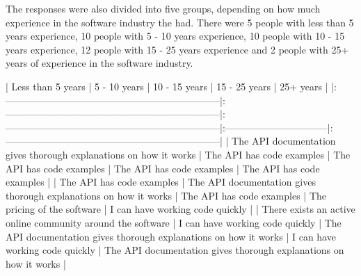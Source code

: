 \documentclass[11pt]{article}
\begin{document}
\begin{multicols}{2}

    The responses were also divided into five groups, depending on how much
    experience in the software industry the had. There were 5 people with
    less than 5 years experience, 10 people with 5 - 10 years experience, 10
    people with 10 - 15 years experience, 12 people with 15 - 25 years
    experience and 2 people with 25+ years of experience in the software
    industry.

    |                         Less than 5 years                         |                           5 - 10 years                            |                           10 - 15 years                           |          15 - 25 years          |                             25+ years                             |
    |:------------------------------------------------------------------|:------------------------------------------------------------------|:------------------------------------------------------------------|:--------------------------------|:------------------------------------------------------------------|
    | The API documentation gives thorough explanations on how it works | The API has code examples                                         | The API has code examples                                         | The API has code examples       | The API has code examples                                         |
    | The API has code examples                                         | The API documentation gives thorough explanations on how it works | The API has code examples                                         | The pricing of the software     | I can have working code quickly                                   |
    | There exists an active online community around the software       | I can have working code quickly                                   | The API documentation gives thorough explanations on how it works | I can have working code quickly | The API documentation gives thorough explanations on how it works |

\end{multicols}
\end{document}
